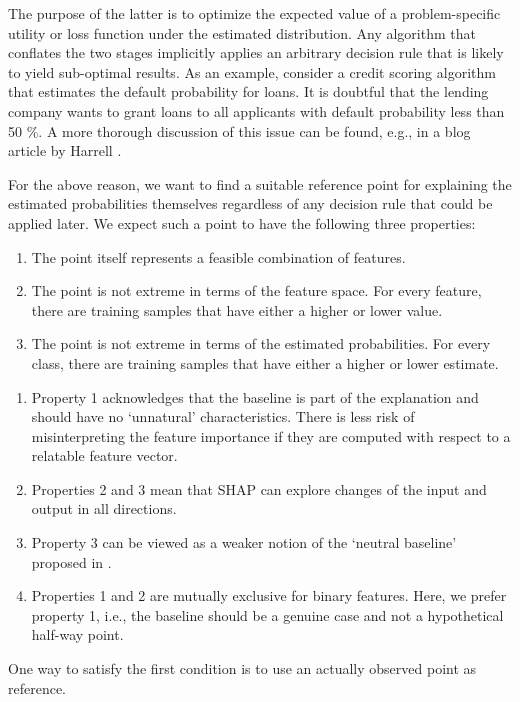The purpose of the latter is to optimize the expected value of a problem-specific utility or loss function under the estimated distribution.
Any algorithm that conflates the two stages implicitly applies an arbitrary decision rule that is likely to yield sub-optimal results.
As an example, consider a credit scoring algorithm that estimates the default probability for loans.
It is doubtful that the lending company wants to grant loans to all applicants with default probability less than 50 \%.
A more thorough discussion of this issue can be found, e.g., in a blog article by Harrell \cite{Harrell_20}.\par
%
For the above reason, we want to find a suitable reference point for explaining the estimated probabilities themselves regardless of any decision rule that could be applied later.
We expect such a point to have the following three properties:
%
\begin{enumerate}
\item The point itself represents a feasible combination of features.
%
\item The point is not extreme in terms of the feature space.
For every feature, there are training samples that have either a higher or lower value.
%
\item The point is not extreme in terms of the estimated probabilities.
For every class, there are training samples that have either a higher or lower estimate.
\end{enumerate}
%
\begin{remark}
\begin{enumerate}
\item Property 1 acknowledges that the baseline is part of the explanation and should have no `unnatural' characteristics.
There is less risk of misinterpreting the feature importance if they are computed with respect to a relatable feature vector.
%
\item Properties 2 and 3 mean that SHAP can explore changes of the input and output in all directions.
%
\item Property 3 can be viewed as a weaker notion of the `neutral baseline' proposed in \cite{Izzo_20}.
%
\item Properties 1 and 2 are mutually exclusive for binary features.
Here, we prefer property 1, i.e., the baseline should be a genuine case and not a hypothetical half-way point.
\end{enumerate}
\end{remark}
%
One way to satisfy the first condition is to use an actually observed point as reference.
